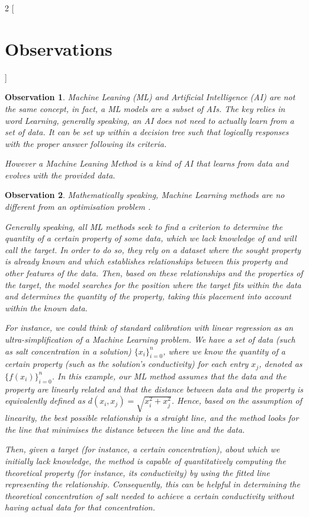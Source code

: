 \documentclass[12pt,letterpaper]{article}
\newtheorem{observation}{Observation}
\begin{document}
\begin{multicols}{2}
[
\section{Observations}
]
\begin{observation}
Machine Leaning (ML) and Artificial Intelligence (AI) are not the same concept, in fact, a ML  models are a subset of AIs. The key relies in word \emph{Learning}, generally speaking, an AI does not need to actually learn from a set of data. It can be set up within a decision tree such that logically responses with the proper answer following its criteria. \par
However a Machine Leaning Method is a kind of AI that \emph{learns} from data and evolves with the provided data.
\end{observation}
\begin{observation}
Mathematically speaking, Machine Learning methods are no different from an optimisation problem \cite{MathematicsForMachineLearningBook}.\par
Generally speaking, all ML methods seek to find a criterion to determine the quantity of a certain property of some data, which we lack knowledge of and will call the \emph{target}. In order to do so, they rely on a dataset where the sought property is already known and which establishes relationships between this property and other features of the data. Then, based on these relationships and the properties of the \emph{target}, the model searches for the position where the \emph{target} fits within the data and determines the quantity of the property, taking this placement into account within the known data.\par
For instance, we could think of standard calibration with linear regression as an ultra-simplification of a Machine Learning problem. We have a set of data (such as salt concentration in a solution) $\{x_i\}_{i=0}^n$, where we know the quantity of a certain property (such as the solution's conductivity) for each entry $x_j$, denoted as $\{f(x_i)\}_{i=0}^n$. In this example, our ML method assumes that the data and the property are linearly related and that the distance between data and the property is equivalently defined as $d(x_i, x_j) = \sqrt{x_i^2 + x_j^2}$. Hence, based on the assumption of linearity, the best possible relationship is a straight line, and the method looks for the line that minimises the distance between the line and the data.\par
Then, given a \emph{target} (for instance, a certain concentration), about which we initially lack knowledge, the method is capable of quantitatively computing the theoretical property (for instance, its conductivity) by using the fitted line representing the relationship. Consequently, this can be helpful in determining the theoretical concentration of salt needed to achieve a certain conductivity without having actual data for that concentration.\par

\end{observation}
\end{multicols}
\end{document}
